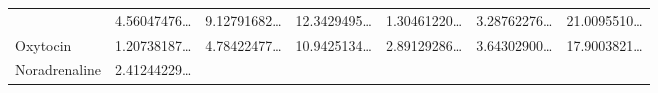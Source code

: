 \documentclass[
]{article}
\begin{document}
\begin{longtable}[]{@{}lllllll@{}}
\begin{minipage}[t]{0.12\columnwidth}
\end{minipage} & \begin{minipage}[t]{0.12\columnwidth}\raggedright
4.56047476\ldots{}\strut
\end{minipage} & \begin{minipage}[t]{0.12\columnwidth}\raggedright
9.12791682\ldots{}\strut
\end{minipage} & \begin{minipage}[t]{0.12\columnwidth}\raggedright
12.3429495\ldots{}\strut
\end{minipage} & \begin{minipage}[t]{0.12\columnwidth}\raggedright
1.30461220\ldots{}\strut
\end{minipage} & \begin{minipage}[t]{0.12\columnwidth}\raggedright
3.28762276\ldots{}\strut
\end{minipage} & \begin{minipage}[t]{0.12\columnwidth}\raggedright
21.0095510\ldots{}\strut
\end{minipage}\tabularnewline
\begin{minipage}[t]{0.12\columnwidth}\raggedright
Oxytocin\strut
\end{minipage} & \begin{minipage}[t]{0.12\columnwidth}\raggedright
1.20738187\ldots{}\strut
\end{minipage} & \begin{minipage}[t]{0.12\columnwidth}\raggedright
4.78422477\ldots{}\strut
\end{minipage} & \begin{minipage}[t]{0.12\columnwidth}\raggedright
10.9425134\ldots{}\strut
\end{minipage} & \begin{minipage}[t]{0.12\columnwidth}\raggedright
2.89129286\ldots{}\strut
\end{minipage} & \begin{minipage}[t]{0.12\columnwidth}\raggedright
3.64302900\ldots{}\strut
\end{minipage} & \begin{minipage}[t]{0.12\columnwidth}\raggedright
17.9003821\ldots{}\strut
\end{minipage}\tabularnewline
\begin{minipage}[t]{0.12\columnwidth}\raggedright
Noradrenaline\strut
\end{minipage} & \begin{minipage}[t]{0.12\columnwidth}\raggedright
2.41244229\ldots{}\strut
\end{minipage} & \begin{minipage}[t]{0.12\columnwidth}\raggedright

\end{minipage}
\end{longtable}
\end{document}
